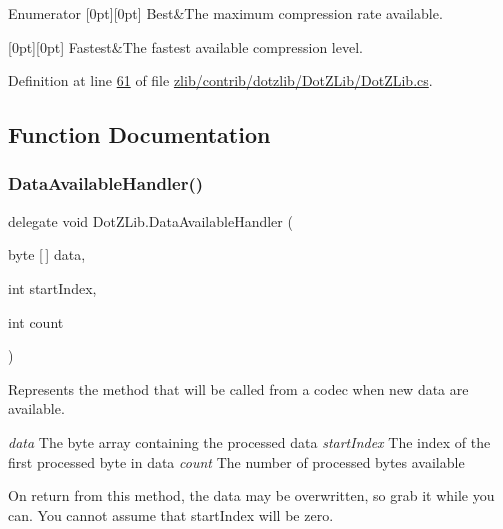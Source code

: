 \begin{DoxyEnumFields}{Enumerator}
[0pt][0pt]{}\mbox{\label{namespace_dot_z_lib_a034f7a1ef9856d8834e6f6b1c53d8a4ca68ef004de6166492c1d668eb8efe09bd}} 
Best&The maximum compression rate available. \\
\hline

[0pt][0pt]{}\mbox{\label{namespace_dot_z_lib_a034f7a1ef9856d8834e6f6b1c53d8a4ca90fd7fdf6f41406a75e5265b9583bb4e}} 
Fastest&The fastest available compression level. \\
\hline

\end{DoxyEnumFields}


Definition at line \hyperlink{zlib_2contrib_2dotzlib_2_dot_z_lib_2_dot_z_lib_8cs_source_l00061}{61} of file \hyperlink{zlib_2contrib_2dotzlib_2_dot_z_lib_2_dot_z_lib_8cs_source}{zlib/contrib/dotzlib/\+Dot\+Z\+Lib/\+Dot\+Z\+Lib.\+cs}.



\subsection{Function Documentation}
\mbox{\label{namespace_dot_z_lib_a13a751b897fc2af0be2307e4deb7eb1c}} 
\subsubsection{\texorpdfstring{Data\+Available\+Handler()}{DataAvailableHandler()}}
{\footnotesize\ttfamily delegate void Dot\+Z\+Lib.\+Data\+Available\+Handler (\begin{DoxyParamCaption}\item[{byte \mbox{[}$\,$\mbox{]}}]{data,  }\item[{int}]{start\+Index,  }\item[{int}]{count }\end{DoxyParamCaption})}



Represents the method that will be called from a codec when new data are available. 

{\itshape data} The byte array containing the processed data {\itshape start\+Index} The index of the first processed byte in {\ttfamily data} {\itshape count} The number of processed bytes available 

On return from this method, the data may be overwritten, so grab it while you can. You cannot assume that start\+Index will be zero. 